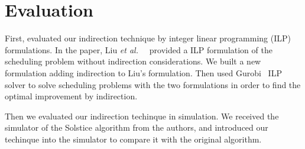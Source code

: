 \section{Evaluation}
\label{sec:goal}
First, evaluated our indirection technique by integer
linear programming (ILP) formulations. In the paper, Liu \textit{et al.\ }~\cite{Liu:2015}
provided a ILP formulation of the scheduling problem without indirection
considerations. We built a new formulation adding indirection to Liu's formulation.
Then used Gurobi~\cite{gurobi}
ILP solver to solve scheduling problems with the two formulations in order
to find the optimal improvement by indirection.

Then we evaluated our indirection techinque in simulation. We received the
simulator of the Solstice algorithm from the authors, and introduced
our techinque into the simulator to compare it with the original algorithm.


